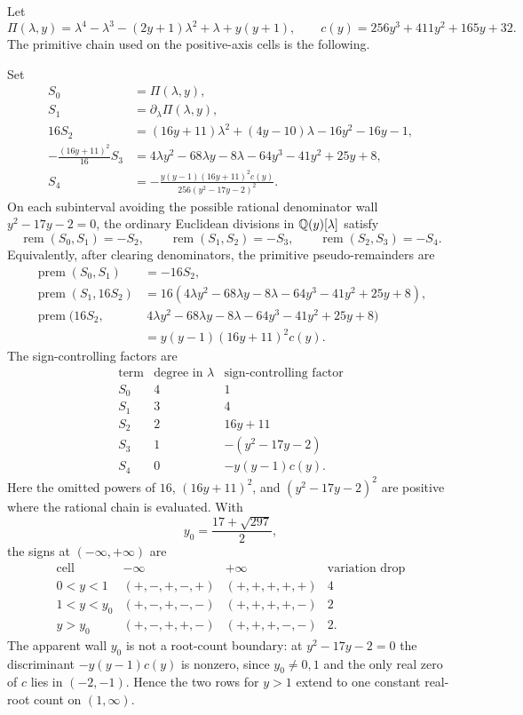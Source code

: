 Let
\[
\Pi(\lambda,y)=\lambda^4-\lambda^3-(2y+1)\lambda^2+\lambda+y(y+1),
\qquad
c(y)=256y^3+411y^2+165y+32.
\]
The primitive chain used on the positive-axis cells is the following.
\begin{proposition}\label{prop:positive-axis-sturm-chain}
Set
\begin{align*}
S_0&=\Pi(\lambda,y),\\
S_1&=\partial_\lambda\Pi(\lambda,y),\\
16S_2&=(16y+11)\lambda^2+(4y-10)\lambda-16y^2-16y-1,\\
-\frac{(16y+11)^2}{16}S_3
&=4\lambda y^2-68\lambda y-8\lambda-64y^3-41y^2+25y+8,\\
S_4&=-\frac{y(y-1)(16y+11)^2c(y)}{256(y^2-17y-2)^2}.
\end{align*}
On each subinterval avoiding the possible rational denominator wall \(y^2-17y-2=0\), the ordinary Euclidean divisions in \(\mathbb{Q}(y)[\lambda]\) satisfy
\[
\operatorname{rem}(S_0,S_1)=-S_2,
\qquad
\operatorname{rem}(S_1,S_2)=-S_3,
\qquad
\operatorname{rem}(S_2,S_3)=-S_4.
\]
Equivalently, after clearing denominators, the primitive pseudo-remainders are
\begin{align*}
\operatorname{prem}(S_0,S_1)
&= -16S_2,\\
\operatorname{prem}(S_1,16S_2)
&=16(4\lambda y^2-68\lambda y-8\lambda-64y^3-41y^2+25y+8),\\
\operatorname{prem}(16S_2,
&\ 4\lambda y^2-68\lambda y-8\lambda-64y^3-41y^2+25y+8)\\
&=y(y-1)(16y+11)^2c(y).
\end{align*}
The sign-controlling factors are
\[
\begin{array}{c|c|c}
\text{term} & \text{degree in }\lambda & \text{sign-controlling factor}\\ \hline
S_0&4&1\\
S_1&3&4\\
S_2&2&16y+11\\
S_3&1&-(y^2-17y-2)\\
S_4&0&-y(y-1)c(y).
\end{array}
\]
Here the omitted powers of \(16\), \((16y+11)^2\), and \((y^2-17y-2)^2\) are positive where the rational chain is evaluated.  With
\[
y_0=\frac{17+\sqrt{297}}2,
\]
the signs at \((-\infty,+\infty)\) are
\[
\begin{array}{c|c|c|c}
\text{cell} & -\infty & +\infty & \text{variation drop}\\ \hline
0<y<1 & (+,-,+,-,+) & (+,+,+,+,+) & 4\\
1<y<y_0 & (+,-,+,-,-) & (+,+,+,+,-) & 2\\
y>y_0 & (+,-,+,+,-) & (+,+,+,-,-) & 2.
\end{array}
\]
The apparent wall \(y_0\) is not a root-count boundary: at \(y^2-17y-2=0\) the discriminant \(-y(y-1)c(y)\) is nonzero, since \(y_0\ne0,1\) and the only real zero of \(c\) lies in \((-2,-1)\).  Hence the two rows for \(y>1\) extend to one constant real-root count on \((1,\infty)\).
\end{proposition}
